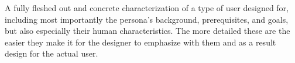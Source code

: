 \begin{tool}[Persona] \label{tool:persona} 
  A fully fleshed out and concrete characterization of a type of user designed for, including most importantly the persona's background, prerequisites, and goals, but also especially their human characteristics. The more detailed these are the easier they make it for the designer to emphasize with them and as a result design for the actual user. \cite[p. 55]{benyon14}
\end{tool}